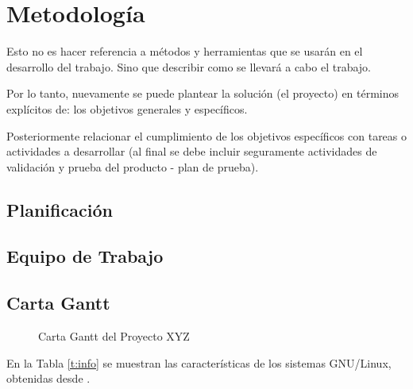 \documentclass[12pt]{report}
\begin{document}
\section{Metodología}
Esto no es hacer referencia a métodos y herramientas que se usarán en el desarrollo del trabajo. Sino que describir como se llevará a cabo el trabajo.

Por lo tanto, nuevamente se puede plantear la solución (el proyecto) en términos explícitos de: los objetivos generales y específicos.

Posteriormente relacionar el cumplimiento de los objetivos específicos con tareas o actividades a desarrollar (al final se debe incluir seguramente actividades de validación y prueba del producto - plan de prueba).

\subsection{Planificación}
\lipsum[1]%



\subsection{Equipo de Trabajo}
\lipsum[1]%


\begin{landscape}
\subsection{Carta Gantt}\label{sec:gantt}
\begin{figure}[hbt]
  \centering
  \caption{Carta Gantt del Proyecto XYZ}
  \label{gantt}
\end{figure}
\end{landscape}







En la Tabla \ref{t:info} se muestran las características de los sistemas GNU/Linux, obtenidas desde \cite{001}.
\end{document}

